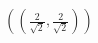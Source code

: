 \documentclass[preview]{standalone}
\begin{document}
\begin{align*}
( \left(\frac{2}{\sqrt{2}} , \frac{2}{\sqrt{2}}\right) )
\end{align*}
\end{document}
